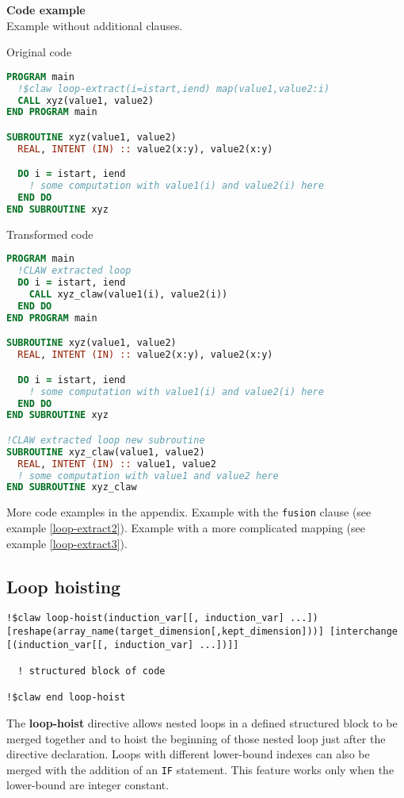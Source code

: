 \textbf{Code example}\\
\label{loop-extract1}
Example without additional clauses.

Original code
\begin{lstlisting}[language=Fortran]
PROGRAM main
  !$claw loop-extract(i=istart,iend) map(value1,value2:i)
  CALL xyz(value1, value2)
END PROGRAM main

SUBROUTINE xyz(value1, value2)
  REAL, INTENT (IN) :: value2(x:y), value2(x:y)

  DO i = istart, iend
    ! some computation with value1(i) and value2(i) here
  END DO
END SUBROUTINE xyz
\end{lstlisting}


Transformed code
\begin{lstlisting}[language=Fortran]
PROGRAM main
  !CLAW extracted loop
  DO i = istart, iend
    CALL xyz_claw(value1(i), value2(i))
  END DO
END PROGRAM main

SUBROUTINE xyz(value1, value2)
  REAL, INTENT (IN) :: value2(x:y), value2(x:y)

  DO i = istart, iend
    ! some computation with value1(i) and value2(i) here
  END DO
END SUBROUTINE xyz

!CLAW extracted loop new subroutine
SUBROUTINE xyz_claw(value1, value2)
  REAL, INTENT (IN) :: value1, value2
  ! some computation with value1 and value2 here
END SUBROUTINE xyz_claw
\end{lstlisting}

More code examples in the appendix. Example with the \lstinline!fusion! clause (see example \ref{loop-extract2}). Example with a more complicated mapping (see example \ref{loop-extract3}).

\subsection{Loop hoisting}
\begin{lstlisting}
!$claw loop-hoist(induction_var[[, induction_var] ...]) [reshape(array_name(target_dimension[,kept_dimension]))] [interchange [(induction_var[[, induction_var] ...])]]

  ! structured block of code

!$claw end loop-hoist
\end{lstlisting}

The \textbf{loop-hoist} directive allows nested loops in a defined structured block to
be merged together and to hoist the beginning of those nested loop just after
the directive declaration. Loops with different lower-bound indexes
can also be merged with the addition of an \lstinline!IF! statement. This feature works
only when the lower-bound are integer constant.


